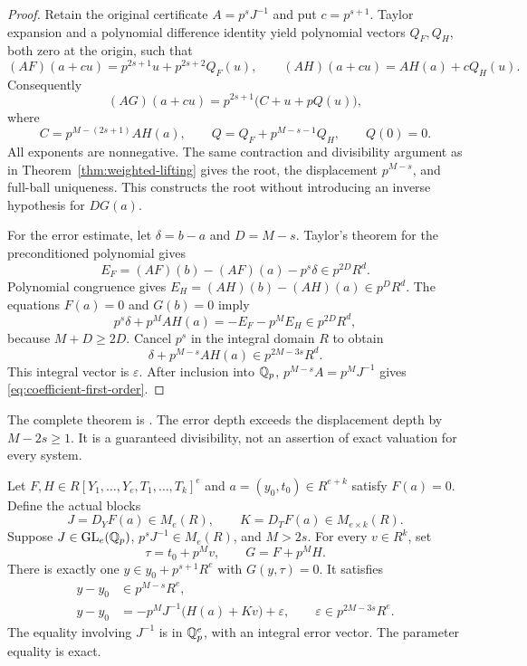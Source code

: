 \begin{proof}
Retain the original certificate $A=p^sJ^{-1}$ and put $c=p^{s+1}$.
Taylor expansion and a polynomial difference identity yield polynomial
vectors $Q_F,Q_H$, both zero at the origin, such that
\[
 (AF)(a+cu)=p^{2s+1}u+p^{2s+2}Q_F(u),\qquad
 (AH)(a+cu)=AH(a)+cQ_H(u).
\]
Consequently
\[
 (AG)(a+cu)=p^{2s+1}\bigl(C+u+pQ(u)\bigr),
\]
where
\[
 C=p^{M-(2s+1)}AH(a),\qquad
 Q=Q_F+p^{M-s-1}Q_H,\qquad Q(0)=0.
\]
All exponents are nonnegative. The same contraction and divisibility
argument as in Theorem~\ref{thm:weighted-lifting} gives the root,
the displacement $p^{M-s}$, and full-ball uniqueness. This constructs the
root without introducing an inverse hypothesis for $DG(a)$.

For the error estimate, let $\delta=b-a$ and $D=M-s$. Taylor's theorem
for the preconditioned polynomial gives
\[
 E_F=(AF)(b)-(AF)(a)-p^s\delta\in p^{2D}R^d.
\]
Polynomial congruence gives
$E_H=(AH)(b)-(AH)(a)\in p^DR^d$.
The equations $F(a)=0$ and $G(b)=0$ imply
\[
 p^s\delta+p^MAH(a)=-E_F-p^ME_H\in p^{2D}R^d,
\]
because $M+D\ge2D$. Cancel $p^s$ in the integral domain $R$ to obtain
\[
 \delta+p^{M-s}AH(a)\in p^{2M-3s}R^d.
\]
This integral vector is $\varepsilon$. After inclusion into $\mathbb Q_p$,
$p^{M-s}A=p^MJ^{-1}$ gives \eqref{eq:coefficient-first-order}.
\end{proof}

The complete theorem is
.
The error depth exceeds the displacement depth by $M-2s\ge1$. It is a
guaranteed divisibility, not an assertion of exact valuation for every
system.

\begin{theorem}
\label{thm:joint-deformation}\leavevmode\par
Let $F,H\in R[Y_1,\ldots,Y_e,T_1,\ldots,T_k]^e$ and
$a=(y_0,t_0)\in R^{e+k}$ satisfy $F(a)=0$. Define the actual blocks
\[
 J=D_YF(a)\in M_e(R),\qquad K=D_TF(a)\in M_{e\times k}(R).
\]
Suppose $J\in\operatorname{GL}_e(\mathbb Q_p)$,
$p^sJ^{-1}\in M_e(R)$, and $M>2s$. For every $v\in R^k$, set
\[
 \tau=t_0+p^Mv,\qquad G=F+p^MH.
\]
There is exactly one $y\in y_0+p^{s+1}R^e$ with $G(y,\tau)=0$.
It satisfies
\begin{equation}\label{eq:joint-first-order}
 \begin{aligned}
  y-y_0&\in p^{M-s}R^e,\\
  y-y_0&=-p^MJ^{-1}\bigl(H(a)+Kv\bigr)+\varepsilon,
  \qquad\varepsilon\in p^{2M-3s}R^e.
 \end{aligned}
\end{equation}
The equality involving $J^{-1}$ is in $\mathbb Q_p^e$, with an integral error
vector. The parameter equality is exact.
\end{theorem}

